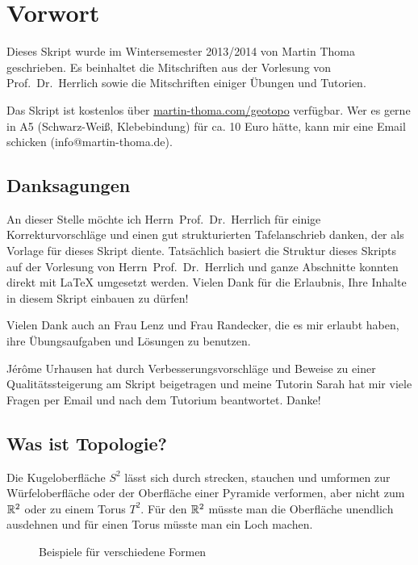\chapter*{Vorwort}
Dieses Skript wurde im Wintersemester 2013/2014
von Martin Thoma geschrieben. Es beinhaltet die Mitschriften aus
der Vorlesung von Prof.~Dr.~Herrlich sowie die Mitschriften einiger
Übungen und Tutorien.

Das Skript ist kostenlos über \href{http://martin-thoma.com/geotopo/}{martin-thoma.com/geotopo}
verfügbar. Wer es gerne in A5 (Schwarz-Weiß, Klebebindung) für ca. 10 Euro hätte, 
kann mir eine Email schicken (info@martin-thoma.de).

\section*{Danksagungen}
An dieser Stelle möchte ich Herrn~Prof.~Dr.~Herrlich für einige 
Korrekturvorschläge und einen gut strukturierten Tafelanschrieb 
danken, der als Vorlage für dieses Skript diente. Tatsächlich basiert
die Struktur dieses Skripts auf der Vorlesung von Herrn~Prof.~Dr.~Herrlich
und ganze Abschnitte konnten direkt mit \LaTeX{} umgesetzt werden.
Vielen Dank für die Erlaubnis, Ihre Inhalte in diesem Skript einbauen
zu dürfen!

Vielen Dank auch an Frau Lenz und Frau Randecker, die es mir erlaubt 
haben, ihre Übungsaufgaben und Lösungen zu benutzen.

Jérôme Urhausen hat durch Verbesserungsvorschläge und Beweise zu einer
Qualitätssteigerung am Skript beigetragen und meine Tutorin Sarah hat mir
viele Fragen per Email und nach dem Tutorium beantwortet. Danke!


\section*{Was ist Topologie?}

Die Kugeloberfläche $S^2$ lässt sich durch strecken, stauchen
und umformen zur Würfeloberfläche oder
der Oberfläche einer Pyramide verformen, aber nicht zum $\mdr^2$
oder zu einem Torus $T^2$. Für den $\mdr^2$ müsste man die Oberfläche
unendlich ausdehnen und für einen Torus müsste man ein Loch machen.

\begin{figure}[ht]
    \centering
    \subfloat[$S^2$]{
        
        \label{fig:s2}
    }%
    \subfloat[Würfel]{
        
        \label{fig:cube}
    }%
    \subfloat[Pyramide]{
        
        \label{fig:pyramide}
    }

    \subfloat[$\mdr^2$]{
        
        \label{fig:plane-r2}
    }%
    \label{fig:formen}
    \caption{Beispiele für verschiedene Formen}
\end{figure}

